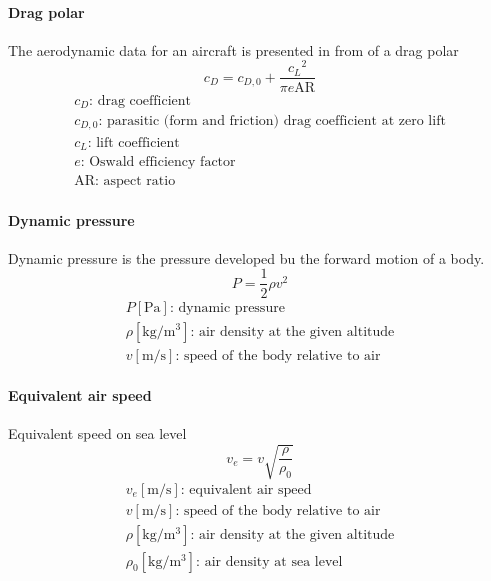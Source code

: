 \documentclass[10pt, twocolumn]{article}
\begin{document}
\paragraph{Drag polar}
The aerodynamic data for an aircraft is presented in from of a drag polar
\[
  c_D = c_{D,0} + \frac{{c_L}^2}{\pi e \mathrm{AR}}
\]
\[
  \begin{array}{|l}
    c_D \text{: drag coefficient}                                                \\
    c_{D,0} \text{: parasitic (form and friction) drag coefficient at zero lift} \\
    c_L \text{: lift coefficient}                                                \\
    e \text{: Oswald efficiency factor}                                          \\
    \mathrm{AR} \text{: aspect ratio}
  \end{array}
\]

\paragraph{Dynamic pressure}
Dynamic pressure is the pressure developed bu the forward motion of a body.
\[
  P = \frac{1}{2} \rho v^2
\]
\[
  \begin{array}{|l}
    P [\si{\pascal}] \text{: dynamic pressure}                                       \\
    \rho [\si{\kilogram\per\metre\cubed}] \text{: air density at the given altitude} \\
    v [\si{\metre\per\second}] \text{: speed of the body relative to air}
  \end{array}
\]

\paragraph{Equivalent air speed}
Equivalent speed on sea level
\[
  v_e = v \sqrt{\frac{\rho}{\rho_0}}
\]
\[
  \begin{array}{|l}
    v_e [\si{\metre\per\second}] \text{: equivalent air speed}                       \\
    v [\si{\metre\per\second}] \text{: speed of the body relative to air}            \\
    \rho [\si{\kilogram\per\metre\cubed}] \text{: air density at the given altitude} \\
    \rho_0 [\si{\kilogram\per\metre\cubed}] \text{: air density at sea level}
  \end{array}
\]
\end{document}
